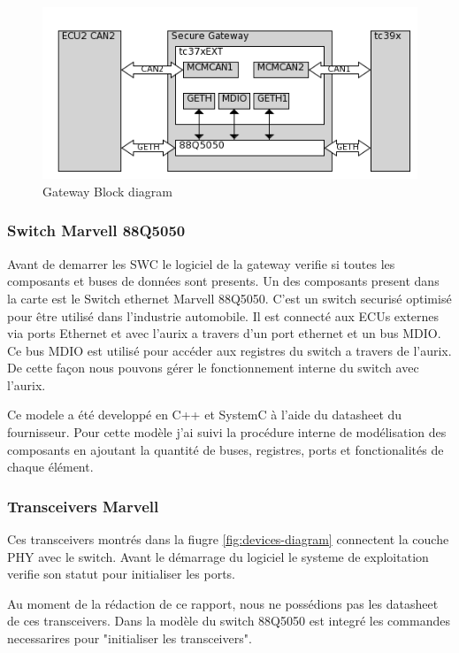 \begin{figure}[!htb]
 \centering
 \includegraphics[width=\textwidth]{img/gateway_block_diagram.png}
 \caption{Gateway Block diagram}
 \label{fig:block diagram}
\end{figure}

\subsubsection{Switch Marvell 88Q5050}

Avant de demarrer les SWC le logiciel de la gateway verifie si toutes les composants et buses de donn\'ees sont presents. Un des composants present dans la carte est le Switch ethernet Marvell 88Q5050\cite{sw88Q5050}. C'est un switch securis\'e optimis\'e pour \^etre utilis\'e dans l'industrie automobile. Il est connect\'e aux ECUs externes via ports Ethernet et avec l'aurix a travers d'un port ethernet et un bus MDIO\cite{mdio-background}. Ce bus MDIO est utilis\'e pour accéder aux registres du switch a travers de l'aurix. De cette façon nous pouvons gérer le fonctionnement interne du switch avec l'aurix.

Ce modele a \'et\'e developp\'e en C++ et SystemC \`a l'aide du datasheet du fournisseur. Pour cette modèle j'ai suivi la procédure interne de modélisation des composants en ajoutant la quantit\'e  de buses, registres, ports et fonctionalit\'es de chaque élément. 

\subsubsection{Transceivers Marvell}

Ces transceivers montr\'es dans la fiugre \ref{fig:devices-diagram}\cite{88Q2112}\cite{88Q1010} connectent la couche PHY avec le switch. Avant le démarrage du logiciel le systeme de exploitation verifie son statut pour initialiser les ports.

Au moment de la rédaction de ce rapport, nous ne possédions pas les datasheet de ces transceivers. Dans la modèle du switch 88Q5050 est integr\'e les commandes necessarires pour "initialiser les transceivers".